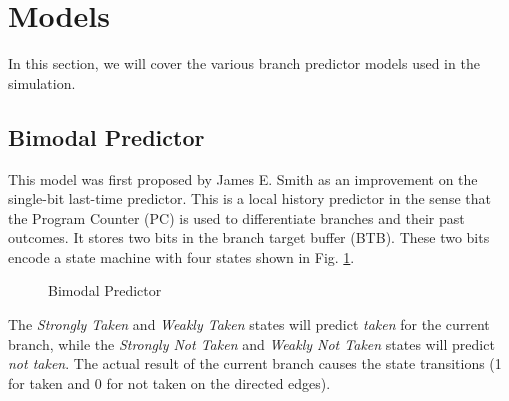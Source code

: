 \documentclass[conference]{IEEEtran}
\begin{document}
\section{Models} \label{sec:models}
In this section, we will cover the various branch predictor models used in the simulation.

\subsection{Bimodal Predictor} \label{ssec:bimodal}
This model was first proposed by James E. Smith as an improvement on the single-bit last-time predictor\cite{smith1981}. This is a local history predictor in the sense that the Program Counter (PC) is used to differentiate branches and their past outcomes. It stores two bits in the branch target buffer (BTB). These two bits encode a state machine with four states shown in Fig. 
\ref{fig:bimodal}. 
\begin{figure}
    \centering
    \caption{Bimodal Predictor}
	\label{fig:bimodal}
\end{figure}
The \textit{Strongly Taken} and \textit{Weakly Taken} states will predict \textit{taken} for the current branch, while the \textit{Strongly Not Taken} and \textit{Weakly Not Taken} states will predict \textit{not taken}. The actual result of the current branch causes the state transitions (1 for taken and 0 for not taken on the directed edges).
\end{document}
